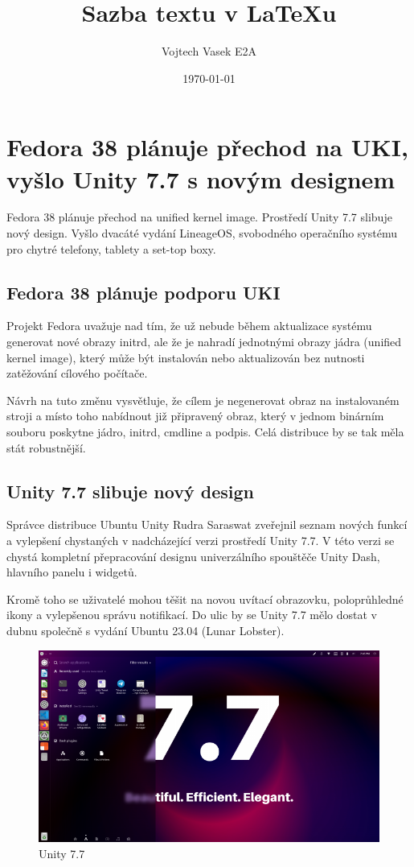 \documentclass[a4paper,12pt]{report}
\title{Sazba textu v LaTeXu}
\author{\parbox{\linewidth}{\center%
Vojtech Vasek\endgraf\bigskip
E2A\endgraf}}
\date{\today}
\begin{document}
\maketitle
\tableofcontents
\newpage
\chapter{Fedora 38 plánuje přechod na UKI, vyšlo Unity 7.7 s novým designem}
Fedora 38 plánuje přechod na unified kernel image. Prostředí Unity 7.7 slibuje nový design. Vyšlo dvacáté vydání LineageOS, svobodného operačního systému pro chytré telefony, tablety a set-top boxy.
\section{Fedora 38 plánuje podporu UKI}

Projekt Fedora uvažuje nad tím, že už nebude během aktualizace systému generovat nové obrazy initrd, ale že je nahradí jednotnými obrazy jádra (unified kernel image), který může být instalován nebo aktualizován bez nutnosti zatěžování cílového počítače.

Návrh na tuto změnu vysvětluje, že cílem je negenerovat obraz na instalovaném stroji a místo toho nabídnout již připravený obraz, který v jednom binárním souboru poskytne jádro, initrd, cmdline a podpis. Celá distribuce by se tak měla stát robustnější.
\section{Unity 7.7 slibuje nový design}
Správce distribuce Ubuntu Unity Rudra Saraswat zveřejnil seznam nových funkcí a vylepšení chystaných v nadcházející verzi prostředí Unity 7.7. V této verzi se chystá kompletní přepracování designu univerzálního spouštěče Unity Dash, hlavního panelu i widgetů.

Kromě toho se uživatelé mohou těšit na novou uvítací obrazovku, poloprůhledné ikony a vylepšenou správu notifikací. Do ulic by se Unity 7.7 mělo dostat v dubnu společně s vydání Ubuntu 23.04 (Lunar Lobster).
\begin{figure}[htp]
\centering
\includegraphics[width=16cm]{IKT_4_1_23@3.png}
\caption{Unity 7.7}
\end{figure}
\end{document}
